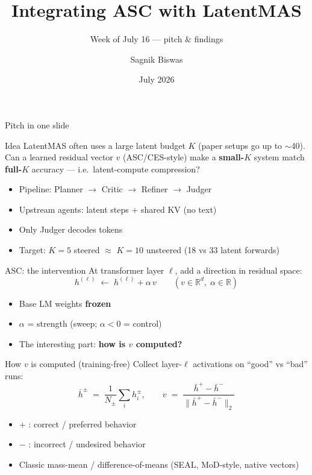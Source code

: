 \documentclass{beamer}
\title{Integrating ASC with LatentMAS}
\subtitle{Week of July 16 --- pitch \& findings}
\author{Sagnik Biswas}
\date{July 2026}
\begin{document}
\begin{frame}
    \titlepage
\end{frame}

\begin{frame}{Pitch in one slide}
    \begin{block}{Idea}
        LatentMAS often uses a large latent budget $K$ (paper setups go up to $\sim$40).
        Can a learned residual vector $v$ (ASC/CES-style) make a \textbf{small-$K$} system
        match \textbf{full-$K$} accuracy --- i.e.\ latent-compute compression?
    \end{block}
    \begin{itemize}
        \item Pipeline: Planner $\rightarrow$ Critic $\rightarrow$ Refiner $\rightarrow$ Judger
        \item Upstream agents: latent steps + shared KV (no text)
        \item Only Judger decodes tokens
        \item Target: $K{=}5$ steered $\approx$ $K{=}10$ unsteered (18 vs 33 latent forwards)
    \end{itemize}
\end{frame}

\begin{frame}{ASC: the intervention}
    At transformer layer $\ell$, add a direction in residual space:
    \[
      h^{(\ell)} \;\leftarrow\; h^{(\ell)} + \alpha\, v
      \qquad (v\in\mathbb{R}^{d},\; \alpha\in\mathbb{R})
    \]
    \begin{itemize}
        \item Base LM weights \textbf{frozen}
        \item $\alpha$ = strength (sweep; $\alpha{<}0$ = control)
        \item The interesting part: \textbf{how is $v$ computed?}
    \end{itemize}
\end{frame}

\begin{frame}{How $v$ is computed (training-free)}
    Collect layer-$\ell$ activations on ``good'' vs ``bad'' runs:
    \[
      \bar h^{\pm} \;=\; \frac{1}{N_{\pm}}\sum_i h_i^{\pm},
      \qquad
      v \;=\; \frac{\bar h^{+} - \bar h^{-}}{\lVert \bar h^{+} - \bar h^{-} \rVert_2}
    \]
    \begin{itemize}
        \item $+$ : correct / preferred behavior
        \item $-$ : incorrect / undesired behavior
        \item Classic mass-mean / difference-of-means (SEAL, MoD-style, native vectors)
    \end{itemize}
\end{frame}
\end{document}
